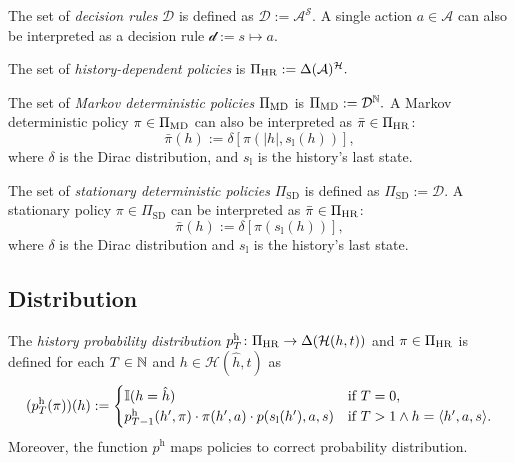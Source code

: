 \begin{definition} \label{def:decision-rule}
The set of \emph{decision rules} $\mathcal{D}$ is defined as \(\mathcal{D} := \mathcal{A}^{\mathcal{S}}. \) A single action $a \in \mathcal{A}$ can also be interpreted as a decision rule $\mathcal{d} := s \mapsto a$.
\leanok
\end{definition}

\begin{definition} \label{def:policy-hr}
The set of \emph{history-dependent policies} is \(\Pi_{\mathrm{HR}} :=  \Delta(\mathcal{A})^{\mathcal{H}}. \)
 \leanok
\end{definition}


\begin{definition} \label{def:policy-md}
The set of \emph{Markov deterministic policies} $\Pi_{\mathrm{MD}}$ is \(\Pi_{\mathrm{MD}} :=  \mathcal{D}^{\mathbb{N}}. \)
A Markov deterministic policy $\pi \in \Pi_{\mathrm{MD}}$ can also be interpreted as $\bar{\pi} \in \Pi_{\mathrm{HR}}$:
\[
  \bar{\pi}(h) := \delta \left[  \pi(|h|, s_{\mathrm{l}}(h)) \right],
\]
where $\delta$ is the Dirac distribution,  and $s_{\mathrm{l}}$ is the history's last state.
\leanok
\end{definition}

\begin{definition} \label{def:policy-sd}
The set of \emph{stationary deterministic policies} $\Pi_{\mathrm{SD}}$ is defined as \(\Pi_{\mathrm{SD}} := \mathcal{D}. \)
A stationary policy $\pi \in \Pi_{\mathrm{SD}}$ can be interpreted as $\bar{\pi} \in \Pi_{\mathrm{HR}}$:
\[
  \bar{\pi}(h) := \delta \left[  \pi(s_{\mathrm{l}}(h)) \right],
\]
where $\delta$ is the Dirac distribution and $s_{\mathrm{l}}$ is the history's last state.
\leanok
\end{definition}

\subsection{Distribution}


\begin{definition}\label{def:hist-dist}
The \emph{history probability distribution} $p^{\mathrm{h}}_T \colon  \Pi_{\mathrm{HR}} \to \Delta(\mathcal{H}(h,t))$  and $\pi \in \Pi_{\mathrm{HR}}$ is defined for each $T \in \mathbb{N}$ and $h\in \mathcal{H}(\hat{h},t)$ as
\[
(p^{\mathrm{h}}_T(\pi))(h) :=
\begin{cases}
\mathbb{I}(h = \hat{h}) &\text{if } T = 0, \\
p_{T-1}^{\mathrm{h}}(h', \pi) \cdot \pi(h',a) \cdot  p(s_{\mathrm{l}}(h'), a , s) &\text{if } T > 1 \wedge h = \langle h', a, s \rangle.
\end{cases}
\]
Moreover, the function $p^{\mathrm{h}}$ maps policies to correct probability distribution.
 \leanok
\end{definition}

